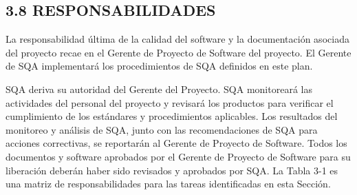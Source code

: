 \subsection{3.8 RESPONSABILIDADES}
La responsabilidad última de la calidad del software y la documentación asociada del proyecto recae en el Gerente de Proyecto de Software del proyecto. El Gerente de SQA implementará los procedimientos de SQA definidos en este plan.

SQA deriva su autoridad del Gerente del Proyecto. SQA monitoreará las actividades del personal del proyecto y revisará los productos para verificar el cumplimiento de los estándares y procedimientos aplicables. Los resultados del monitoreo y análisis de SQA, junto con las recomendaciones de SQA para acciones correctivas, se reportarán al Gerente de Proyecto de Software. Todos los documentos y software aprobados por el Gerente de Proyecto de Software para su liberación deberán haber sido revisados y aprobados por SQA. La Tabla 3-1 es una matriz de responsabilidades para las tareas identificadas en esta Sección.

